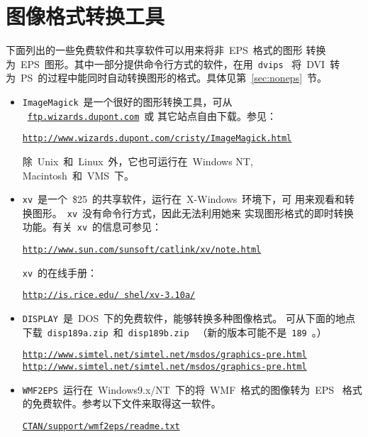 \section{图像格式转换工具}\label{sec:convertor}

下面列出的一些免费软件和共享软件可以用来将非~EPS~格式的图形
转换为~EPS~图形。其中一部分提供命令行方式的软件，在用~\texttt{dvips}~
将~DVI~转为~PS~的过程中能同时自动转换图形的格式。具体见第~\ref{sec:noneps}~节。

\begin{itemize}
	\item \texttt{ImageMagick}~是一个很好的图形转换工具，可从
	~\href{ftp://ftp.wizards.dupont.com}{\texttt{ftp.wizards.dupont.com}}~或
	其它站点自由下载。参见：
	
	\href{http://www.wizards.dupont.com/cristy/ImageMagick.html}%
	{\texttt{http://www.wizards.dupont.com/cristy/ImageMagick.html}}
	
	除~Unix~和~Linux~外，它也可运行在~Windows NT, Macintosh~和~VMS~下。
	
	\item \texttt{xv}~是一个~\$25~的共享软件，运行在~X-Windows~环境下，可
	用来观看和转换图形。~\texttt{xv}~没有命令行方式，因此无法利用她来
	实现图形格式的即时转换功能。有关~\texttt{xv}~的信息可参见：
	
	\href{http://www.sun.com/sunsoft/catlink/xv/note.html}%
	{\texttt{http://www.sun.com/sunsoft/catlink/xv/note.html}}
	
	\texttt{xv}~的在线手册：
	
	\href{http://is.rice.edu/~shel/xv-3.10a/}{\texttt{http://is.rice.edu/~shel/xv-3.10a/}}
	
	\item \texttt{DISPLAY}~是~DOS~下的免费软件，能够转换多种图像格式。
	可从下面的地点下载~\texttt{disp189a.zip}~和~\texttt{disp189b.zip}~
	（新的版本可能不是~\texttt{189}~。）
	
	\href{http://www.simtel.net/simtel.net/msdos/graphics-pre.html}%
	{\texttt{http://www.simtel.net/simtel.net/msdos/graphics-pre.html}} \\
	\href{http://www.simtel.net/simtel.net/msdos/graphics-pre.html}%
	{\texttt{http://www.simtel.net/simtel.net/msdos/graphics-pre.html}}
	
	\item \texttt{WMF2EPS}~运行在~Windows9.x/NT~下的将~WMF~格式的图像转为~EPS~
	格式的免费软件。参考以下文件来取得这一软件。
	
	\href{ftp://ftp.tug.org/tex-archive/support/wmf2eps/readme.txt}%
	{\texttt{CTAN/support/wmf2eps/readme.txt}}
	

\end{itemize}
